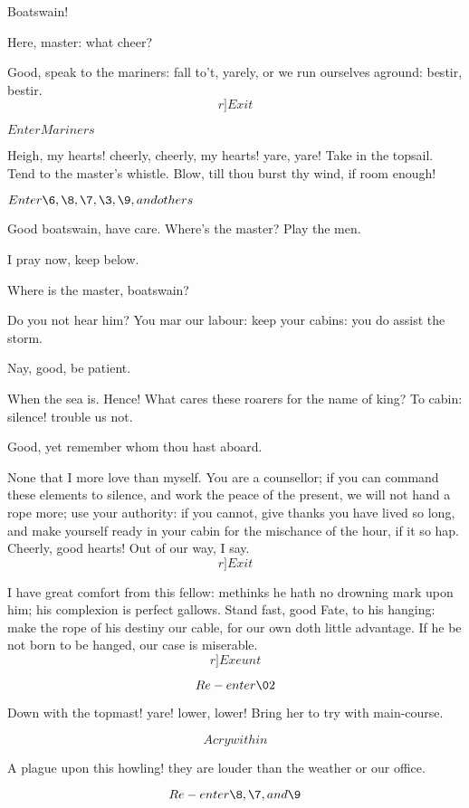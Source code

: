 \documentclass[11pt]{book}
\begin{document}
\begin{PROSE}

	Boatswain!      

	Here, master: what cheer?

	Good, speak to the mariners: fall to't, yarely,
	or we run ourselves aground: bestir, bestir. \[r]Exit\]

	\(Enter Mariners\)

	Heigh, my hearts! cheerly, cheerly, my hearts!
	yare, yare! Take in the topsail. Tend to the
	master's whistle. Blow, till thou burst thy wind,
	if room enough!

	\(Enter \6, \8, \7, \3, \9, and others\)

\6	Good boatswain, have care. Where's the master?
	Play the men.

	I pray now, keep below.

\7	Where is the master, boatswain?

	Do you not hear him? You mar our labour: keep your
	cabins: you do assist the storm.

\9	Nay, good, be patient.

	When the sea is. Hence! What cares these roarers
	for the name of king? To cabin: silence! trouble us not.

\9	Good, yet remember whom thou hast aboard.

	None that I more love than myself. You are a
	counsellor; if you can command these elements to
	silence, and work the peace of the present, we will
	not hand a rope more; use your authority: if you
	cannot, give thanks you have lived so long, and make
	yourself ready in your cabin for the mischance of
	the hour, if it so hap. Cheerly, good hearts! Out
	of our way, I say. \[r]Exit\]

\9	I have great comfort from this fellow: methinks he
	hath no drowning mark upon him; his complexion is
	perfect gallows. Stand fast, good Fate, to his
	hanging: make the rope of his destiny our cable,
	for our own doth little advantage. If he be not
	born to be hanged, our case is miserable.  \[r]Exeunt\]

	\[Re-enter \02\]

	Down with the topmast! yare! lower, lower! Bring
	her to try with main-course.

	\[A cry within\]

	A plague upon this howling! they are louder than
	the weather or our office.

	\[Re-enter \8, \7, and \9\]


\end{PROSE}
\end{document}
